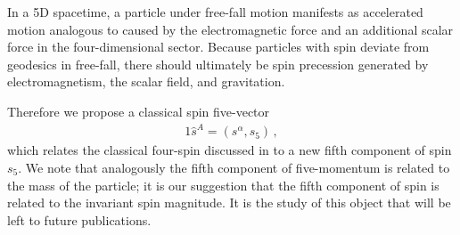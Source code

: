 In a 5D spacetime, a particle under free-fall motion manifests as accelerated motion analogous to  caused by the electromagnetic force and an additional scalar force in the four-dimensional sector. Because particles with spin deviate from geodesics in free-fall, there should ultimately be spin precession generated by electromagnetism, the scalar field, and gravitation.

Therefore we propose a classical spin five-vector
\begin{alignat}{1}
	\label{KALUZA01a} \hat{s}^{A}=(s^{\alpha},s_{5})\,,
\end{alignat}
which relates the classical four-spin  discussed in  to a new fifth component of spin $s_{5}$. We note that analogously the fifth component of five-momentum is related to the mass of the particle; it is our suggestion that the fifth component of spin is related to the invariant spin magnitude. It is the study of this object that will be left to future publications.